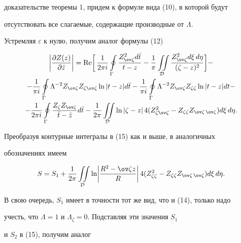 доказательстве теоремы 1, придем к формуле вида (10), в которой будут 


отсутствовать все слагаемые, содержащие производные от $\Lambda$. 


Устремляя $\varepsilon$ к нулю, получим аналог формулы (12) 


\begin{multline} 


\biggl|\frac{\partial Z(z)}{\partial\Bar z}\biggr|=\re\biggl[\, 


\frac{1}{2\pi i}\ointl_\Gamma 


\frac{Z^2_{\ov\zeta}d\Bar t}{t-z}-\frac{1}{\pi}\iintl_{\cal D} 


\frac{Z^2_{\ov\zeta}d\xi\,d\eta}{(\zeta-z)^2}\biggr]-\\ 


% 


-\frac{1}{\pi i}\ointl_\Gamma\Lambda^{-2}Z_{\ov\zeta}Z_{\zeta\ov\zeta} 


\ln|t-z|d\Bar t-\frac{1}{\pi i}\ointl_\Gamma 


\Lambda^{-2}Z_{\ov\zeta}Z_{\zeta\zeta}\ln|t-z|dt-\\ 


% 


-\frac{1}{2\pi i}\ointl_\Gamma 


\frac{Z_\zeta Z_{\ov\zeta}}{\Bar t-\Bar z}d\Bar t-\frac{1}{2\pi} 


\iintl_{\cal D}\ln|\zeta-z|\, 4


(Z^2_{\zeta\ov\zeta}-Z_{\zeta\zeta}Z_{\ov\zeta\,\ov\zeta}) 


d\xi\,d\eta. 


\end{multline} 


Преобразуя контурные интегралы в (15) как и выше, в аналогичных 


обозначениях имеем 


$$ 


S=S_1+\frac{1}{2\pi}\iintl_{\cal D}\ln\biggl| 


\frac{R^2-\ov\zeta z}{R}\biggr|\,4(Z^2_{\zeta\zeta}-Z_{\zeta\zeta} 


Z_{\ov\zeta\,\ov\zeta})d\xi\,d\eta. 


$$ 


В свою очередь, $S_1$ имеет в точности тот же вид, что и (14), только надо 


учесть, что $\Lambda=1$ и $\Lambda_\zeta=0$. Подставляя эти значения $S_1$ 


и $S_2$ в (15), получим аналог 


